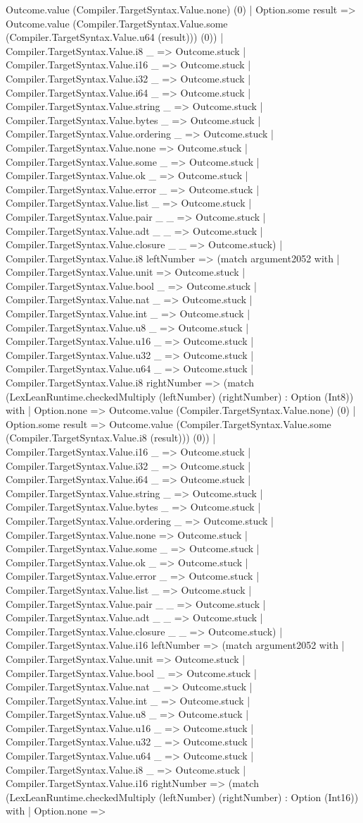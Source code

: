\documentclass[11pt]{article}
\begin{document}
Outcome.value (Compiler.TargetSyntax.Value.none) (0) | Option.some result => Outcome.value (Compiler.TargetSyntax.Value.some (Compiler.TargetSyntax.Value.u64 (result))) (0)) | Compiler.TargetSyntax.Value.i8 \_ => Outcome.stuck | Compiler.TargetSyntax.Value.i16 \_ => Outcome.stuck | Compiler.TargetSyntax.Value.i32 \_ => Outcome.stuck | Compiler.TargetSyntax.Value.i64 \_ => Outcome.stuck | Compiler.TargetSyntax.Value.string \_ => Outcome.stuck | Compiler.TargetSyntax.Value.bytes \_ => Outcome.stuck | Compiler.TargetSyntax.Value.ordering \_ => Outcome.stuck | Compiler.TargetSyntax.Value.none => Outcome.stuck | Compiler.TargetSyntax.Value.some \_ => Outcome.stuck | Compiler.TargetSyntax.Value.ok \_ => Outcome.stuck | Compiler.TargetSyntax.Value.error \_ => Outcome.stuck | Compiler.TargetSyntax.Value.list \_ => Outcome.stuck | Compiler.TargetSyntax.Value.pair \_ \_ => Outcome.stuck | Compiler.TargetSyntax.Value.adt \_ \_ => Outcome.stuck | Compiler.TargetSyntax.Value.closure \_ \_ => Outcome.stuck) | Compiler.TargetSyntax.Value.i8 leftNumber => (match argument2052 with | Compiler.TargetSyntax.Value.unit => Outcome.stuck | Compiler.TargetSyntax.Value.bool \_ => Outcome.stuck | Compiler.TargetSyntax.Value.nat \_ => Outcome.stuck | Compiler.TargetSyntax.Value.int \_ => Outcome.stuck | Compiler.TargetSyntax.Value.u8 \_ => Outcome.stuck | Compiler.TargetSyntax.Value.u16 \_ => Outcome.stuck | Compiler.TargetSyntax.Value.u32 \_ => Outcome.stuck | Compiler.TargetSyntax.Value.u64 \_ => Outcome.stuck | Compiler.TargetSyntax.Value.i8 rightNumber => (match (LexLeanRuntime.checkedMultiply (leftNumber) (rightNumber) : Option (Int8)) with | Option.none => Outcome.value (Compiler.TargetSyntax.Value.none) (0) | Option.some result => Outcome.value (Compiler.TargetSyntax.Value.some (Compiler.TargetSyntax.Value.i8 (result))) (0)) | Compiler.TargetSyntax.Value.i16 \_ => Outcome.stuck | Compiler.TargetSyntax.Value.i32 \_ => Outcome.stuck | Compiler.TargetSyntax.Value.i64 \_ => Outcome.stuck | Compiler.TargetSyntax.Value.string \_ => Outcome.stuck | Compiler.TargetSyntax.Value.bytes \_ => Outcome.stuck | Compiler.TargetSyntax.Value.ordering \_ => Outcome.stuck | Compiler.TargetSyntax.Value.none => Outcome.stuck | Compiler.TargetSyntax.Value.some \_ => Outcome.stuck | Compiler.TargetSyntax.Value.ok \_ => Outcome.stuck | Compiler.TargetSyntax.Value.error \_ => Outcome.stuck | Compiler.TargetSyntax.Value.list \_ => Outcome.stuck | Compiler.TargetSyntax.Value.pair \_ \_ => Outcome.stuck | Compiler.TargetSyntax.Value.adt \_ \_ => Outcome.stuck | Compiler.TargetSyntax.Value.closure \_ \_ => Outcome.stuck) | Compiler.TargetSyntax.Value.i16 leftNumber => (match argument2052 with | Compiler.TargetSyntax.Value.unit => Outcome.stuck | Compiler.TargetSyntax.Value.bool \_ => Outcome.stuck | Compiler.TargetSyntax.Value.nat \_ => Outcome.stuck | Compiler.TargetSyntax.Value.int \_ => Outcome.stuck | Compiler.TargetSyntax.Value.u8 \_ => Outcome.stuck | Compiler.TargetSyntax.Value.u16 \_ => Outcome.stuck | Compiler.TargetSyntax.Value.u32 \_ => Outcome.stuck | Compiler.TargetSyntax.Value.u64 \_ => Outcome.stuck | Compiler.TargetSyntax.Value.i8 \_ => Outcome.stuck | Compiler.TargetSyntax.Value.i16 rightNumber => (match (LexLeanRuntime.checkedMultiply (leftNumber) (rightNumber) : Option (Int16)) with | Option.none => 
\end{document}
